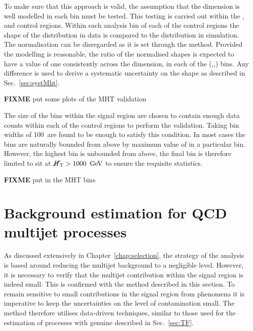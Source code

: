 To make sure that this approach is valid, the assumption that the \MHT
dimension is well modelled in each bin must be tested. This testing is
carried out within the \gj, \mj and \mmj control regions. Within each
analysis bin of each of the control regions the shape of the \MHT
distribution in data is compared to the distribution in \MC
simulation. The normalisation can be disregarded as it is set through the
\TF method.  Provided the modelling is reasonable, the ratio of the
normalised shapes is expected to have a value of one consistently
across the \MHT dimension, in each of the (\HT,\nj,\nb) bins. Any
difference is used to derive a systematic uncertainty on the \MHT
shape as described in Sec.~\ref{sec:systMht}.

{\bf FIXME} put some plots of the MHT validation

The size of the \MHT bins within the signal region are chosen to
contain enough data counts within each of the control regions to
perform the validation. Taking \MHT bin widths of 100~\gev are found
to be enough to satisfy this condition. In most cases the \MHT bins
are naturally bounded from above by maximum value of \HT in a
particular bin.  However, the highest \HT bin is unbounded from above,
the final \MHT bin is therefore limited to sit at $\mbox{$\cancel{H}_\text{T}$}>1000~\mathrm{\,Ge\kern -0.1em V}$ to
ensure the requisite statistics.

{\bf FIXME} put in the MHT bins



\section{Background estimation for QCD multijet processes} %
\label{sec:qcdEstimation}

As discussed extensively in Chapter~\ref{chap:selection}, the strategy
of the analysis is based around reducing the \QCD multijet background
to a negligible level. However, it is necessary to verify that the
multijet contribution within the signal region is indeed small. This
is confirmed with the method described in this section. To remain
sensitive to small contributions in the signal region from \BSM
phenomena it is imperative to keep the uncertainties on the level of
\QCD contamination small. The method therefore utilises data-driven
techniques, similar to those used for the estimation of processes with
genuine \MET described in Sec.~\ref{sec:TF}.


